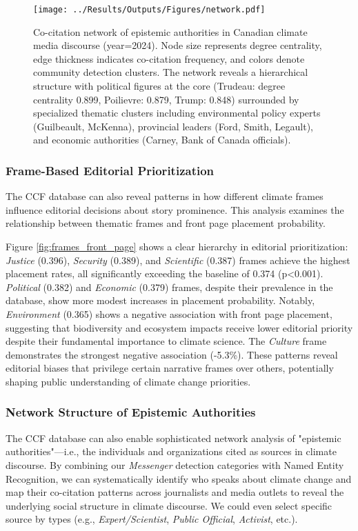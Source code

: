 \documentclass[12pt]{article}
\begin{document}
\begin{figure}[b!]
\centering
\texttt{[image: ../Results/Outputs/Figures/network.pdf]}
\caption{Co-citation network of epistemic authorities in Canadian climate media discourse (year=2024). Node size represents degree centrality, edge thickness indicates co-citation frequency, and colors denote community detection clusters. The network reveals a hierarchical structure with political figures at the core (Trudeau: degree centrality 0.899, Poilievre: 0.879, Trump: 0.848) surrounded by specialized thematic clusters including environmental policy experts (Guilbeault, McKenna), provincial leaders (Ford, Smith, Legault), and economic authorities (Carney, Bank of Canada officials).}
\label{fig:network}
\end{figure}

\subsubsection{Frame-Based Editorial Prioritization}

The CCF database can also reveal patterns in how different climate frames influence editorial decisions about story prominence. This analysis examines the relationship between thematic frames and front page placement probability.

Figure \ref{fig:frames_front_page} shows a clear hierarchy in editorial prioritization: \emph{Justice} (0.396), \emph{Security} (0.389), and \emph{Scientific} (0.387) frames achieve the highest placement rates, all significantly exceeding the baseline of 0.374 (p<0.001). \emph{Political} (0.382) and \emph{Economic} (0.379) frames, despite their prevalence in the database, show more modest increases in placement probability. Notably, \emph{Environment} (0.365) shows a negative association with front page placement, suggesting that biodiversity and ecosystem impacts receive lower editorial priority despite their fundamental importance to climate science. The \emph{Culture} frame demonstrates the strongest negative association (-5.3\%). These patterns reveal editorial biases that privilege certain narrative frames over others, potentially shaping public understanding of climate change priorities. 

\subsubsection{Network Structure of Epistemic Authorities}

The CCF database can also enable sophisticated network analysis of "epistemic authorities"—i.e., the individuals and organizations cited as sources in climate discourse. By combining our \emph{Messenger} detection categories with Named Entity Recognition, we can systematically identify who speaks about climate change and map their co-citation patterns across journalists and media outlets to reveal the underlying social structure in climate discourse. We could even select specific source by types (e.g., \emph{Expert/Scientist}, \emph{Public Official}, \emph{Activist}, etc.). 
\end{document}
